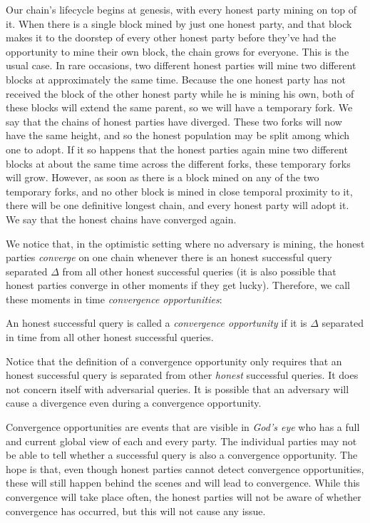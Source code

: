 Our chain's lifecycle begins at genesis, with every honest party mining on top of it.
When there is a single block mined by just one honest party, and that block makes it to
the doorstep of every other honest party before they've had the opportunity to mine their
own block, the chain grows for everyone. This is the usual case. In rare occasions, two
different honest parties will mine two different blocks at approximately the same time.
Because the one honest party has not received the block of the other honest party while
he is mining his own, both of these blocks will extend the same parent, so we will have a
temporary fork. We say that the chains of honest parties have diverged.
These two forks will now have the same height, and so the honest population
may be split among which one to adopt. If it so happens that the honest parties again
mine two different blocks at about the same time across the different forks, these temporary
forks will grow. However, as soon as there is a block mined on any of the
two temporary forks, and no other block is mined in close temporal proximity to it,
there will be one definitive longest chain, and every honest party will adopt it.
We say that the honest chains have converged again.

We notice that, in the optimistic setting where no adversary is mining, the honest parties
\emph{converge} on one chain whenever there is an honest successful query separated $\Delta$
from all other honest successful queries (it is also possible that honest parties converge
in other moments if they get lucky). Therefore, we call these moments in time \emph{convergence
opportunities}:

\begin{definition}
    An honest successful query is called a \emph{convergence opportunity} if it is $\Delta$
    separated in time from all other honest successful queries.
\end{definition}

Notice that the definition of a convergence opportunity only requires that an honest successful
query is separated from other \emph{honest} successful queries. It does not concern itself with
adversarial queries. It is possible that an adversary will cause a divergence even during a
convergence opportunity.

Convergence opportunities are events that are visible in \emph{God's eye} who has a full
and current global view of each and every party. The individual parties may not be able to tell
whether a successful query is also a convergence opportunity. The hope is that, even though honest
parties cannot detect convergence opportunities, these will still happen behind the scenes
and will lead to convergence. While this convergence will take place often, the honest
parties will not be aware of whether convergence has occurred, but this will not cause
any issue.

